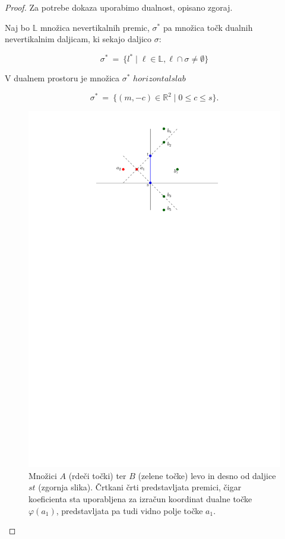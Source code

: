 \documentclass[a4paper, 12pt]{book}
\newcommand{\LL}{\ensuremath{\mathbb L}}
\newcommand{\RR}{\ensuremath{\mathbb R}}  %
\begin{document}
\begin{proof}
Za potrebe dokaza uporabimo dualnost, opisano zgoraj.

Naj bo $\LL$ množica nevertikalnih premic, $\sigma^*$ pa množica točk dualnih nevertikalnim daljicam, ki sekajo daljico $\sigma$:

\[
		\sigma^* ~=~ \{ l^* \mid \ell\in \LL, \ell\cap \sigma\neq \emptyset\} 
\]

V dualnem prostoru je množica $\sigma^*$ $horizontal slab$

\[
		\sigma^* ~=~ \{ (m,-c)\in \RR^2\mid 0\le c\le s\}.
\]

\begin{figure}
\centerline{\includegraphics[scale=1.2]{pics/dual_problem3.pdf}}
\caption{Množici $A$ (rdeči točki) ter $B$ (zelene točke) levo in desno od daljice $st$ (zgornja slika). Črtkani črti predstavljata premici, čigar koeficienta sta uporabljena za izračun koordinat dualne točke $\varphi (a_1)$, predstavljata pa tudi vidno polje točke $a_1$.} 
\label{dualp}
\end{figure}


\end{proof}
\end{document}
